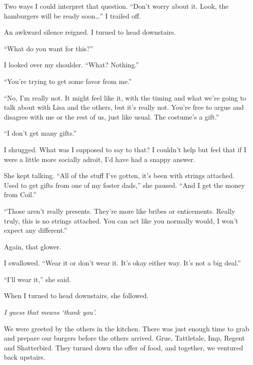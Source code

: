 Two ways I could interpret that question.  ``Don't worry about it.  Look, the hamburgers will be ready soon\ldots'' I trailed off.



An awkward silence reigned.  I turned to head downstairs.



``What do you want for this?''



I looked over my shoulder.  ``What?  Nothing.''



``You're trying to get some favor from me.''



``No, I'm really not.  It might feel like it, with the timing and what we're going to talk about with Lisa and the others, but it's really not.  You're free to argue and disagree with me or the rest of us, just like usual.  The costume's a gift.''



``I don't get many gifts.''



I shrugged.  What was I supposed to say to that?  I couldn't help but feel that if I were a little more socially adroit, I'd have had a snappy answer.



She kept talking.  ``All of the stuff I've gotten, it's been with strings attached.  Used to get gifts from one of my foster dads,'' she paused.  ``And I get the money from Coil.''



``Those aren't really presents.  They're more like bribes or enticements.  Really truly, this is no strings attached.  You can act like you normally would, I won't expect any different.''



Again, that glower.



I swallowed.  ``Wear it or don't wear it.  It's okay either way.  It's not a big deal.''



``I'll wear it,'' she said.



When I turned to head downstairs, she followed.



\emph{I guess that means `thank you'.}



We were greeted by the others in the kitchen.  There was just enough time to grab and prepare our burgers before the others arrived.  Grue, Tattletale, Imp, Regent and Shatterbird.  They turned down the offer of food, and together, we ventured back upstairs.



